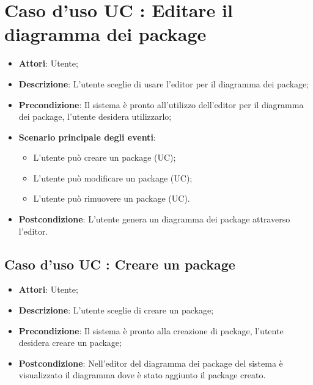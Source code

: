 \documentclass[../AnalisiDeiRequisiti.tex]{subfiles}
\begin{document}
		\section{Caso d'uso UC : Editare il diagramma dei package}
			\begin{itemize}
				\item \textbf{Attori}: Utente;
				\item \textbf{Descrizione}: L'utente sceglie di usare l'editor per il
				diagramma dei package;
				\item \textbf{Precondizione}: Il sistema è pronto all'utilizzo dell'editor per
				il diagramma dei package, l'utente desidera utilizzarlo;
				\item \textbf{Scenario principale degli eventi}:
					\begin{itemize}
						\item L'utente può creare un package (UC);
						\item L'utente può modificare un package (UC);
						\item L'utente può rimuovere un package (UC).
					\end{itemize}
				\item \textbf{Postcondizione}: L'utente genera un diagramma dei package
				attraverso l'editor.
			\end{itemize}
		\subsection{Caso d'uso UC : Creare un package}
			\begin{itemize}
				\item \textbf{Attori}: Utente;
				\item \textbf{Descrizione}: L'utente sceglie di creare un package;
				\item \textbf{Precondizione}: Il sistema è pronto alla creazione di package,
				l'utente desidera creare un package;
				\item \textbf{Postcondizione}: Nell'editor del diagramma dei package del
				sistema è visualizzato il diagramma dove è stato aggiunto il package creato.
			\end{itemize}
\end{document}
